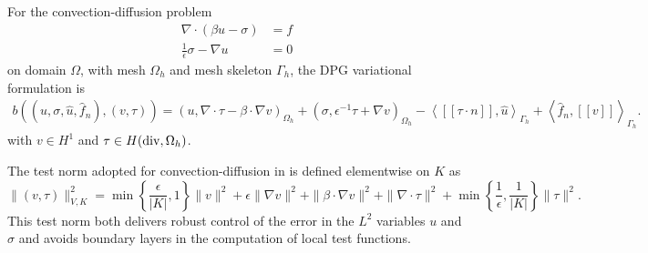 \documentclass{article}
\newcommand{\grad}{\nabla}
\renewcommand{\div}{\grad \cdot}
\newcommand{\Gh}{\Gamma_h}
\newcommand{\Oh}{\Omega_h}
\newcommand{\LRa}[1]{\left\langle #1 \right\rangle}
\newcommand{\LRs}[1]{\left[ #1 \right]}
\newcommand{\jump}[1] {\ensuremath{\LRs{\![#1]\!}}}
\begin{document}
For the convection-diffusion problem 
\begin{align*}
\div \left(\beta u - \sigma\right) &= f\\
\frac{1}{\epsilon}\sigma - \grad u &= 0
\end{align*}
on domain $\Omega$, with mesh $\Oh$ and mesh skeleton $\Gh$, the DPG variational formulation is
\begin{align*}
b\left(\left(u,\sigma, \widehat{u}, \widehat{f}_n\right),
\left( v, \tau \right)\right) = \left(u,\div \tau - \beta \cdot \grad
v\right)_{\Oh} + \left(\sigma, \epsilon^{-1} \tau + \grad v\right)_{\Oh} - \LRa{
\jump{\tau\cdot n}, \widehat{u} }_{\Gh} + \LRa{ \widehat{f}_n,
  \jump{v} }_{\Gh}.
\end{align*}
with $v\in H^1$ and $\tau \in H({\rm div},\Oh)$. 

The test norm adopted for convection-diffusion in \cite{DPGrobustness,DPGrobustness2} is defined elementwise on $K$ as
\[
\|\left(v,\tau\right)\|_{V,K}^2 = \min\left\{\frac{\epsilon}{|K|},1\right\}\|v\|^2 + \epsilon \|\grad v\|^2 + \|\beta \cdot \grad v\|^2 + \| \div \tau\|^2 + \min\left\{\frac{1}{\epsilon},\frac{1}{|K|}\right\}\|\tau\|^2.
\]
This test norm both delivers robust control of the error in the $L^2$ variables $u$ and $\sigma$ and avoids boundary layers in the computation of local test functions. 
\end{document}
